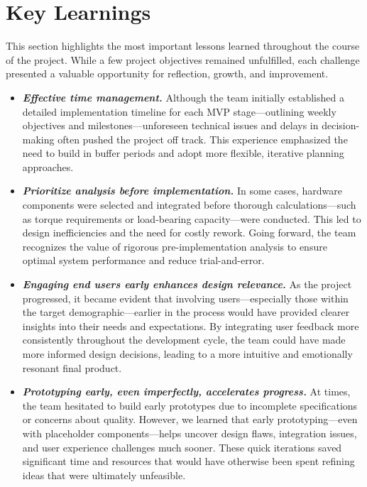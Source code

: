 \section{Key Learnings}
This section highlights the most important lessons learned throughout the course of the project. While a few project objectives remained unfulfilled, each challenge presented a valuable opportunity for reflection, growth, and improvement.

\begin{itemize}
    \item \textbf{\textit{Effective time management.}} Although the team initially established a detailed implementation timeline for each MVP stage—outlining weekly objectives and milestones—unforeseen technical issues and delays in decision-making often pushed the project off track. This experience emphasized the need to build in buffer periods and adopt more flexible, iterative planning approaches.
    \item \textbf{\textit{Prioritize analysis before implementation.}} In some cases, hardware components were selected and integrated before thorough calculations—such as torque requirements or load-bearing capacity—were conducted. This led to design inefficiencies and the need for costly rework. Going forward, the team recognizes the value of rigorous pre-implementation analysis to ensure optimal system performance and reduce trial-and-error.
    \item \textbf{\textit{Engaging end users early enhances design relevance.}} As the project progressed, it became evident that involving users—especially those within the target demographic—earlier in the process would have provided clearer insights into their needs and expectations. By integrating user feedback more consistently throughout the development cycle, the team could have made more informed design decisions, leading to a more intuitive and emotionally resonant final product. 
    \item \textbf{\textit{Prototyping early, even imperfectly, accelerates progress.}} At times, the team hesitated to build early prototypes due to incomplete specifications or concerns about quality. However, we learned that early prototyping—even with placeholder components—helps uncover design flaws, integration issues, and user experience challenges much sooner. These quick iterations saved significant time and resources that would have otherwise been spent refining ideas that were ultimately unfeasible.
\end{itemize}
